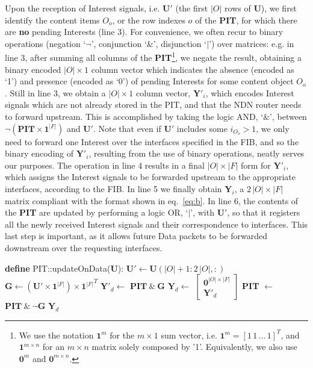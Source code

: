 Upon the reception of Interest signals, i.e. $\textbf{U}'$ (the first $|O|$ rows 
of $\textbf{U}$), we first identify the content items $O_o$, or the row indexes $o$ of the 
\textbf{PIT}, for which there are \textbf{no} pending Interests (line 3). For 
convenience, we often recur to binary operations (negation `$\neg$', 
conjunction `$\&$', disjunction `$|$') over matrices: e.g. in line 3, after 
summing all columns of the \textbf{PIT}\footnote{We use the notation $\textbf{1}^{m}$ for the $m \times 1$
sum vector, i.e. $\textbf{1}^{m} = [1\,1\,...\,1]^{T}$, and $\textbf{1}^{m \times n}$ for an $m \times n$ 
matrix solely composed by '1'. Equivalently, we also use $\textbf{0}^{m}$ and $\textbf{0}^{m \times n}$.}, we negate the 
result, obtaining a binary encoded $|O| \times 1$ 
column vector which indicates the absence (encoded as  `1') and presence 
(encoded as `0') of pending Interests for some content object $O_o$. Still in 
line 3, we obtain a $|O| \times 1$ column vector, $\textbf{Y}'_i$, which encodes 
Interest signals which are not already stored in the PIT, and that the NDN router needs to forward upstream. This is 
accomplished by taking the logic AND, `$\&$', between $\neg(\textbf{PIT} \times \textbf{1}^{|F|})$ and 
$\textbf{U}'$. Note that even 
if $\textbf{U}'$ includes some $i_{O_o} > 1$, we only need to forward one Interest 
over the interfaces specified in the FIB, and so the binary encoding of $\textbf{Y}'_i$, 
resulting from the use of binary operations, neatly serves our purposes. The operation 
in line 4 results in a final $|O| \times |F|$ form for $\textbf{Y}'_i$, which assigns the 
Interest signals to be forwarded upstream to the appropriate interfaces, according to the FIB. 
In line 5 we finally obtain $\textbf{Y}_i$, a $2\,|O| \times |F|$ matrix compliant 
with the format shown in eq.~\ref{eq:b}. 
In line 6, the 
contents of the \textbf{PIT} are updated by performing a logic OR, `$|$', with $\textbf{U}'$, so 
that it registers all the newly received 
Interest signals and their correspondence to interfaces. This last step is important, 
as it allows future Data packets to be forwarded downstream over the requesting 
interfaces.\shortvertbreak

\begin{algorithmic}[1]

\State \textbf{define} PIT::updateOnData($\textbf{U}$):
    \Statex[2]
    \State $\textbf{U}' \leftarrow \textbf{U}(|O|+1:2\,|O|,:)$
    \State $\textbf{G} \leftarrow (\textbf{U}' \times \textbf{1}^{|F|}) \times {\textbf{1}^{|F|}}^{T}$
    \State $\textbf{Y}'_d \leftarrow$ $\textbf{PIT} \ \& \ \textbf{G}$
    \State $\textbf{Y}_d \leftarrow$ $\begin{bmatrix} \textbf{0}^{|O| \times |F|} \\ \textbf{Y}'_d \end{bmatrix}$
    \State \textbf{PIT} $\leftarrow$ $\textbf{PIT} \ \& \ \neg\textbf{G}$ 
    \State \Return $\textbf{Y}_d$

\end{algorithmic}\shortvertbreak

